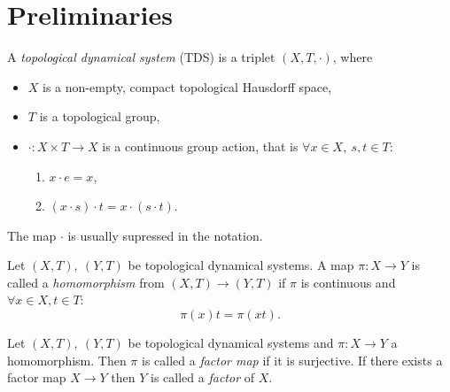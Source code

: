 \section{Preliminaries}
\begin{definition}
  A \emph{topological dynamical system} (TDS) is a triplet $(X,T,\cdot)$, where
  \begin{itemize}
    \item $X$ is a non-empty, compact topological Hausdorff space,
    \item $T$ is a topological group,
    \item $\cdot : X \times T \to X$ is a continuous group action, that is $\forall x \in X, \ s,t \in T$: 
    \begin{enumerate}
      \item $ x\cdot e = x$,
      \item $(x\cdot s)\cdot t = x \cdot (s \cdot t)$.
    \end{enumerate}
  \end{itemize}
\end{definition}
\begin{remark}
  The map $\cdot$ is usually supressed in the notation.
\end{remark}

\begin{definition}
  Let $(X,T), \ (Y,T)$ be topological dynamical systems.
  A map $\pi : X \to Y$ is called a \emph{homomorphism} from $(X,T) \to (Y,T)$ if $\pi$ is continuous and $\forall x \in X, t \in T$:
  \begin{equation*}
     \pi (x)   t = \pi ( x t).
  \end{equation*}
\end{definition}
\begin{definition}
   Let $(X,T), \ (Y,T)$ be topological dynamical systems and $\pi: X \to Y$ a homomorphism.
   Then $\pi$ is called a \emph{factor map} if it is surjective.
   If there exists a factor map $X \to Y$ then $Y$ is called a \emph{factor} of $X$.
\end{definition}

